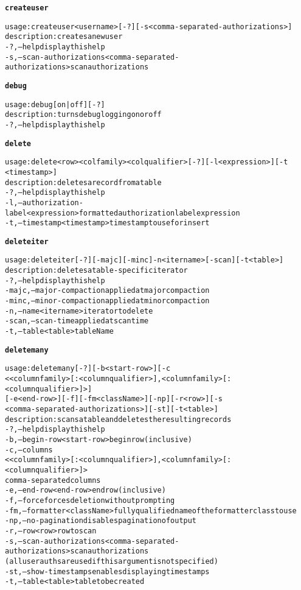 \begin{alltt}
\textbf{createuser}

    usage: createuser <username> [-?] [-s <comma-separated-authorizations>]
    description: creates a new user
      -?,--help  display this help
      -s,--scan-authorizations <comma-separated-authorizations>  scan authorizations

\textbf{debug}

    usage: debug [ on | off ] [-?]
    description: turns debug logging on or off
      -?,--help  display this help

\textbf{delete}

    usage: delete <row> <colfamily> <colqualifier> [-?] [-l <expression>] [-t
              <timestamp>]
    description: deletes a record from a table
      -?,--help  display this help
      -l,--authorization-label <expression>  formatted authorization label expression
      -t,--timestamp <timestamp>  timestamp to use for insert

\textbf{deleteiter}

    usage: deleteiter [-?] [-majc] [-minc] -n <itername> [-scan] [-t <table>]
    description: deletes a table-specific iterator
      -?,--help  display this help
      -majc,--major-compaction  applied at major compaction
      -minc,--minor-compaction  applied at minor compaction
      -n,--name <itername>  iterator to delete
      -scan,--scan-time  applied at scan time
      -t,--table <table>  tableName

\textbf{deletemany}

    usage: deletemany [-?] [-b <start-row>] [-c
              <<columnfamily>[:<columnqualifier>]{,<columnfamily>[:<columnqualifier>]}>]
              [-e <end-row>] [-f] [-fm <className>] [-np] [-r <row>] [-s
              <comma-separated-authorizations>] [-st] [-t <table>]
    description: scans a table and deletes the resulting records
      -?,--help  display this help
      -b,--begin-row <start-row>  begin row (inclusive)
      -c,--columns
              <<columnfamily>[:<columnqualifier>]{,<columnfamily>[:<columnqualifier>]}> 
              comma-separated columns
      -e,--end-row <end-row>  end row (inclusive)
      -f,--force  forces deletion without prompting
      -fm,--formatter <className>  fully qualified name of the formatter class to use
      -np,--no-pagination  disables pagination of output
      -r,--row <row>  row to scan
      -s,--scan-authorizations <comma-separated-authorizations>  scan authorizations
              (all user auths are used if this argument is not specified)
      -st,--show-timestamps  enables displaying timestamps
      -t,--table <table>  table to be created


\end{alltt}
